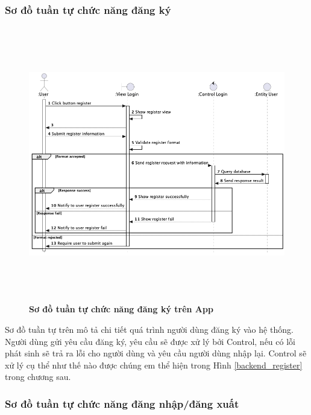 \subsubsection{Sơ đồ tuần tự chức năng đăng ký}
  \begin{figure}[H]
        \centering
        \includegraphics[width=16cm,height=12cm]{Images/mobile_app/register.png}
        \caption[Sơ đồ tuần tự chức năng đăng ký trên App]{\bfseries \fontsize{12pt}{0pt}
        \selectfont Sơ đồ tuần tự chức năng đăng ký trên App}
        \label{register} %
  \end{figure}
  Sơ đồ tuần tự trên mô tả chi tiết quá trình người dùng đăng ký vào hệ thống. Người dùng gửi yêu cầu đăng ký, yêu cầu sẽ
  được xử lý bởi Control, nếu có lỗi phát sinh sẽ trả ra lỗi cho người dùng và yêu cầu người dùng nhập lại. Control
  sẽ xử lý cụ thể như thế nào được chúng em thể hiện trong Hình \ref{backend_register} trong chương sau.
\subsubsection{Sơ đồ tuần tự chức năng đăng nhập/đăng xuất}

